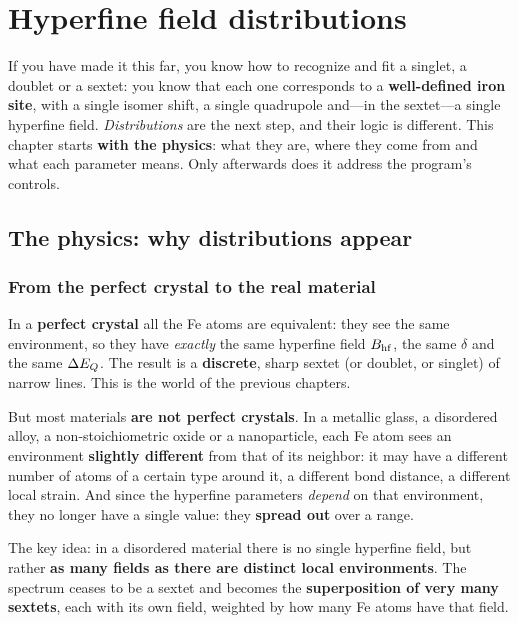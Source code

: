\chapter{Hyperfine field distributions}
\label{ch:distribuciones}

If you have made it this far, you know how to recognize and fit a singlet, a
doublet or a sextet: you know that each one corresponds to a \textbf{well-defined
iron site}, with a single isomer shift, a single quadrupole and---in the
sextet---a single hyperfine field. \emph{Distributions} are the next step, and
their logic is different. This chapter starts \textbf{with the physics}: what they
are, where they come from and what each parameter means. Only afterwards does it
address the program's controls.

\section{The physics: why distributions appear}
\label{sec:fisica-dist}

\subsection{From the perfect crystal to the real material}

In a \textbf{perfect crystal} all the Fe atoms are equivalent: they see the same
environment, so they have \emph{exactly} the same hyperfine field $B_{\mathrm{hf}}$, the same
$\delta$ and the same $\Delta E_{Q}$. The result is a \textbf{discrete}, sharp sextet (or
doublet, or singlet) of narrow lines. This is the world of the previous chapters.

But most materials \textbf{are not perfect crystals}. In a metallic glass, a
disordered alloy, a non-stoichiometric oxide or a nanoparticle, each Fe atom sees
an environment \textbf{slightly different} from that of its neighbor: it may have a
different number of atoms of a certain type around it, a different bond distance, a
different local strain. And since the hyperfine parameters \emph{depend} on that
environment, they no longer have a single value: they \textbf{spread out} over a
range.

\begin{nota}
The key idea: in a disordered material there is no single hyperfine field, but
rather \textbf{as many fields as there are distinct local environments}. The
spectrum ceases to be a sextet and becomes the \textbf{superposition of very many
sextets}, each with its own field, weighted by how many Fe atoms have that field.
\end{nota}

